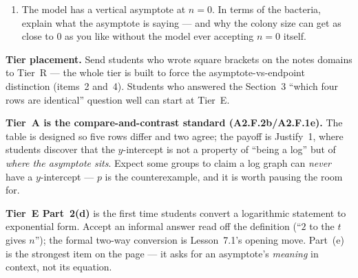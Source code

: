 \documentclass[10pt]{article}
\begin{document}
\begin{tcolorbox}[colback=white, colframe=black!40, title=\textbf{Tier E --- Extension},
    fonttitle=\bfseries, arc=1.5mm, left=3mm, right=3mm, top=2mm, bottom=2mm, breakable]
\begin{enumerate}[label=(\alph*), leftmargin=1.9em, itemsep=6pt]
        Which function family is that?  \quad What does this tell you about the
        relationship between $t(n)$ and the function you just wrote? 
  \item The model has a vertical asymptote at $n=0$. In terms of the bacteria, explain what the
        asymptote is saying --- and why the colony size can get as close to $0$ as you like without
        the model ever accepting $n=0$ itself. 
\end{enumerate}
\end{tcolorbox}

\begin{teachernote}
\textbf{Tier placement.} Send students who wrote square brackets on the notes domains to Tier~R --- the
whole tier is built to force the asymptote-vs-endpoint distinction (items~2 and~4). Students who
answered the Section~3 ``which four rows are identical'' question well can start at Tier~E.

\textbf{Tier~A is the compare-and-contrast standard (A2.F.2b/A2.F.1e).} The table is designed so
five rows differ and two agree; the payoff is Justify~1, where students discover that the
$y$-intercept is not a property of ``being a log'' but of \emph{where the asymptote sits}. Expect
some groups to claim a log graph can \emph{never} have a $y$-intercept --- $p$ is the counterexample,
and it is worth pausing the room for.

\textbf{Tier~E Part~2(d)} is the first time students convert a logarithmic statement to exponential
form. Accept an informal answer read off the definition (``$2$ to the $t$ gives $n$''); the formal
two-way conversion is Lesson~7.1's opening move. Part~(e) is the strongest item on the page --- it
asks for an asymptote's \emph{meaning} in context, not its equation.
\end{teachernote}
\end{document}
